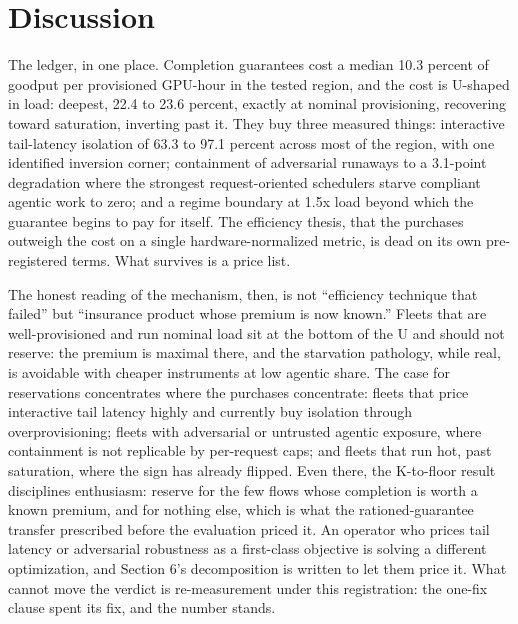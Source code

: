 \section{Discussion}

The ledger, in one place. Completion guarantees cost a median 10.3
percent of goodput per provisioned GPU-hour in the tested region, and
the cost is U-shaped in load: deepest, 22.4 to 23.6 percent, exactly at
nominal provisioning, recovering toward saturation, inverting past it.
They buy three measured things: interactive tail-latency isolation of
63.3 to 97.1 percent across most of the region, with one identified
inversion corner; containment of adversarial runaways to a 3.1-point
degradation where the strongest request-oriented schedulers starve
compliant agentic work to zero; and a regime boundary at 1.5x load
beyond which the guarantee begins to pay for itself. The efficiency
thesis, that the purchases outweigh the cost on a single
hardware-normalized metric, is dead on its own pre-registered terms.
What survives is a price list.

The honest reading of the mechanism, then, is not ``efficiency technique
that failed'' but ``insurance product whose premium is now known.'' Fleets
that are well-provisioned and run nominal load sit at the bottom of the
U and should not reserve: the premium is maximal there, and the
starvation pathology, while real, is avoidable with cheaper instruments
at low agentic share. The case for reservations concentrates where the
purchases concentrate: fleets that price interactive tail latency highly
and currently buy isolation through overprovisioning; fleets with
adversarial or untrusted agentic exposure, where containment is not
replicable by per-request caps; and fleets that run hot, past
saturation, where the sign has already flipped. Even there, the
K-to-floor result disciplines enthusiasm: reserve for the few flows
whose completion is worth a known premium, and for nothing else, which
is what the rationed-guarantee transfer prescribed before the evaluation
priced it. An operator who prices tail latency or adversarial robustness
as a first-class objective is solving a different optimization, and
Section 6's decomposition is written to let them price it. What cannot
move the verdict is re-measurement under this registration: the one-fix
clause spent its fix, and the number stands.
